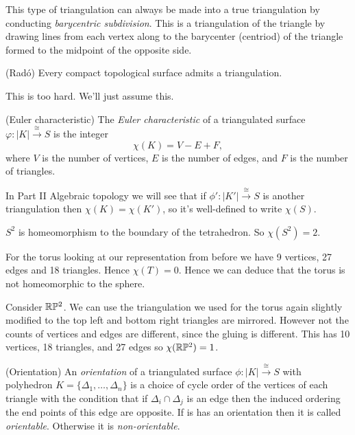 \documentclass{article}
\newcommand{\homeo}{\overset{\cong}{\longrightarrow}}
\begin{document}
This type of triangulation can always be made into a true triangulation by conducting \textit{barycentric subdivision}. This is a triangulation of the triangle by drawing lines from each vertex along to the barycenter (centriod) of the triangle formed to the midpoint of the opposite side.
\begin{theorem}
	(Rad\'o) Every compact topological surface admits a triangulation.
\end{theorem}
This is too hard. We'll just assume this.
\begin{definition}
	(Euler characteristic) The \textit{Euler characteristic} of a triangulated surface $ \varphi:|K| \homeo S $ is the integer
	\[
	  \chi(K) = V - E + F,
	\]
	where $ V $ is the number of vertices, $ E $ is the number of edges, and $ F $ is the number of triangles.
\end{definition}
\begin{remark}
  In Part II Algebraic topology we will see that if $ \phi': |K'| \homeo S $ is another triangulation then $ \chi(K) = \chi(K') $, so it's well-defined to write $ \chi(S) $.
\end{remark}
\begin{example}
  $ S^2 $ is homeomorphism to the boundary of the tetrahedron. So $ \chi(S^2) = 2 $.
\end{example}
\begin{example}
  For the torus looking at our representation from before we have 9 vertices, 27 edges and 18 triangles. Hence $ \chi(T) = 0 $. Hence we can deduce that the torus is not homeomorphic to the sphere.
\end{example}
\begin{example}
  Consider $ \mathbb{R}\mathbb P^2 $. We can use the triangulation we used for the torus again slightly modified to the top left and bottom right triangles are mirrored. However not the counts of vertices and edges are different, since the gluing is different. This has 10 vertices, 18 triangles, and 27 edges so $ \chi(\mathbb{R}\mathbb P^2) = 1 $.
\end{example}
\begin{definition}
	(Orientation) An \textit{orientation} of a triangulated surface $ \phi:|K|\homeo S $ with polyhedron $ K = \{\Delta_1, \dots, \Delta_n\} $ is a choice of cycle order of the vertices of each triangle with the condition that if $ \Delta_i \cap \Delta_j $ is an edge then the induced ordering the end points of this edge are opposite. If is has an orientation then it is called \textit{orientable}. Otherwise it is \textit{non-orientable}.
\end{definition}
\end{document}
